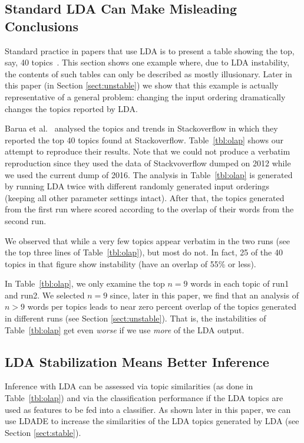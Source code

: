 \documentclass[twocolumn,5p,sort&compress]{elsarticle}
\newcommand{\tion}[1]{\ref{sect:#1}}
\theoremstyle{break}
\begin{document}
\subsection{Standard LDA Can Make Misleading Conclusions}
Standard practice in papers that use LDA is to present a table showing the top, say, 40
topics~\cite{barua2014developers}.
This section shows one example where, due to LDA instability,
the contents of such tables can only be described as  mostly illusionary.
Later in this paper (in Section \tion{unstable}) we show that this example is actually representative of
a general problem: changing the input ordering dramatically changes the topics
reported by LDA.

Barua et al.~\cite{barua2014developers}
analysed the topics and trends in Stackoverflow in which they reported the top 40 topics found at Stackoverflow. Table~\ref{tbl:olap} shows our attempt to reproduce their results.
Note that we could not produce a verbatim reproduction since they used the data of Stackvoverflow dumped on 2012 while we used the current dump of 2016.
The analysis in Table~\ref{tbl:olap} is generated by running LDA twice with different
randomly generated input orderings (keeping all other parameter settings intact). After that, the topics generated from the first run where scored
according to the overlap of their words
from the second run.

We observed that while a very few topics appear verbatim in the two runs (see the top three lines of Table~\ref{tbl:olap}), but
most do not. In fact,
25 of the 40 topics in that figure show  instability (have an overlap of 55\% or less).

In Table~\ref{tbl:olap}, we only
examine the top $n=9$ words in each topic of run1 and run2. We selected \mbox{$n=9$} since,
later in this paper, we find that an analysis of \mbox{$n>9$} words per topics leads to near
 zero percent overlap of the topics generated in different runs (see Section \tion{unstable}).
That is, the instabilities of Table~\ref{tbl:olap} get even {\em worse} if we use {\em more} of the LDA output.

\subsection{LDA Stabilization Means Better Inference}

Inference with LDA can be assessed via topic similarities (as done in Table~\ref{tbl:olap}) and via the classification performance if the LDA topics are used as features to be fed into a classifier. As shown later in this paper, we can use LDADE to increase the similarities of the LDA
topics generated by LDA (see Section \tion{stable}).
\end{document}
